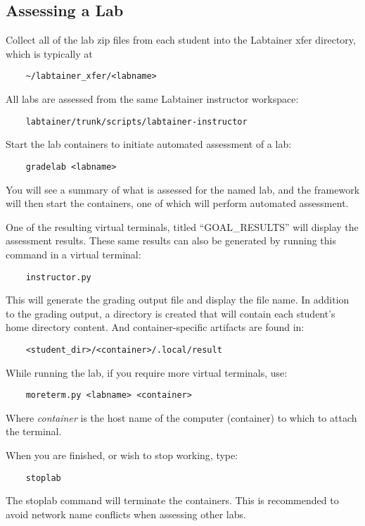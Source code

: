 \documentclass[12pt]{article}
\begin{document}
\subsection{Assessing a Lab}
Collect all of the lab zip files from each student into the Labtainer xfer directory, which
is typically at
\begin{verbatim}
    ~/labtainer_xfer/<labname>
\end{verbatim}
All labs are assessed from the same Labtainer instructor workspace:
\begin{verbatim}
    labtainer/trunk/scripts/labtainer-instructor
\end{verbatim}
\noindent Start the lab containers to initiate automated assessment of a lab:
\begin{verbatim}
    gradelab <labname>
\end{verbatim}
\noindent You will see a summary of what is assessed for the named lab, and the framework
will then start the containers, one of which will perform automated assessment.

One of the resulting virtual terminals, titled ``GOAL\_RESULTS'' will display the assessment results.
These same results can also be generated by running this command in a virtual terminal:
\begin{verbatim}
    instructor.py
\end{verbatim}
\noindent This will generate the grading output file and display the file name.  In
addition to the grading output, a directory is created that will contain each student's
home directory content.  And container-specific artifacts are found in:
\begin{verbatim}
    <student_dir>/<container>/.local/result
\end{verbatim}

\noindent While running the lab, if you require more virtual terminals, use:
\begin{verbatim}
    moreterm.py <labname> <container>
\end{verbatim}
\noindent Where \textit{container} is the host name of the computer (container) to which to attach the terminal.

\noindent When you are finished, or wish to stop working, type:
\begin{verbatim}
    stoplab
\end{verbatim}
The stoplab command will terminate the containers.  This is recommended to avoid network
name conflicts when assessing other labs.
\end{document}
